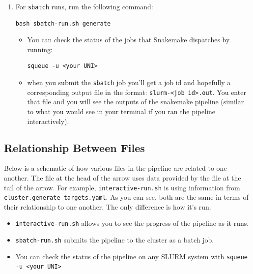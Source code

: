 \documentclass{article}
\begin{document}
\begin{enumerate}
        \item For \texttt{sbatch} runs, run the following command:
        \begin{lstlisting}[style=bashstyle]
            bash sbatch-run.sh generate
        \end{lstlisting}
        \begin{itemize}
            \item You can check the status of the jobs that Snakemake dispatches by running:
            \begin{lstlisting}[style=bashstyle]
                squeue -u <your UNI>
            \end{lstlisting}
            
            \item when you submit the \texttt{sbatch} job you'll get a job id and hopefully a corresponding output file in the format: \texttt{slurm-<job id>.out}. You enter that file and you will see the outputs of the snakemake pipeline (similar to what you would see in your terminal if you ran the pipeline interactively).
        \end{itemize}
    \end{enumerate}
    
    \subsection{Relationship Between Files}
    \noindent Below is a schematic of how various files in the pipeline are related to one another. The file at the head of the arrow uses data provided by the file at the tail of the arrow. For example, \texttt{interactive-run.sh} is using information from \texttt{cluster.generate-targets.yaml}. As you can see, both are the same in terms of their relationship to one another. The only difference is how it's run.

    \begin{itemize}
        \item \texttt{interactive-run.sh} allows you to see the progress of the pipeline as it runs.
        \item \texttt{sbatch-run.sh} submits the pipeline to the cluster as a batch job.
        \item You can check the status of the pipeline on any SLURM system with \texttt{squeue -u <your UNI>}
    \end{itemize}
\end{document}
